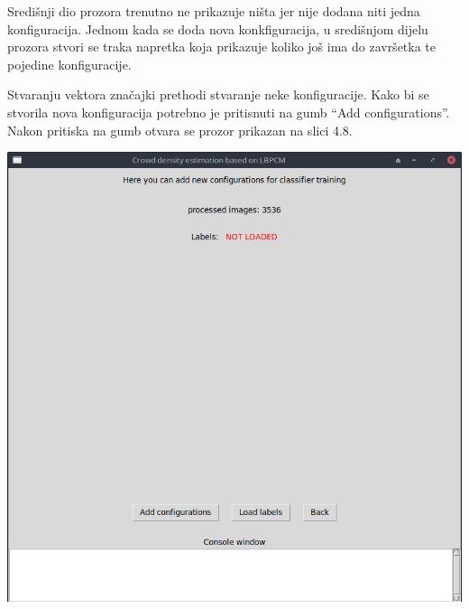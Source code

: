 \documentclass[times, utf8, zavrsni]{fer}
\begin{document}
\bigbreak

Središnji dio prozora trenutno ne prikazuje ništa jer nije dodana niti jedna
konfiguracija. Jednom kada se doda nova konkfiguracija, u središnjom dijelu
prozora stvori se traka napretka koja prikazuje koliko još ima do završetka 
te pojedine konfiguracije. 

Stvaranju vektora značajki prethodi stvaranje neke konfiguracije. Kako bi se 
stvorila nova konfiguracija potrebno je pritisnuti na gumb \enquote{Add configurations}.
Nakon pritiska na gumb otvara se prozor prikazan na slici 4.8.

\newpage

\begin{minipage}{\linewidth}
\centering
\includegraphics[scale=0.35]{img/fvc1.png}
\end{minipage}

\bigbreak
\end{document}

